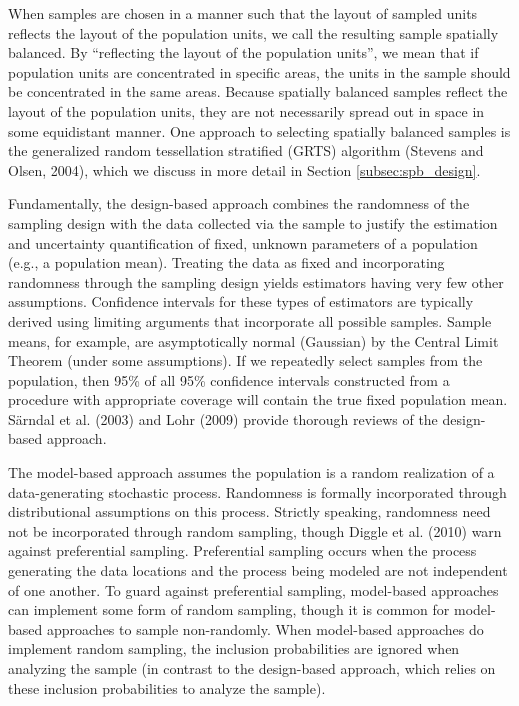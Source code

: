 \documentclass[]{elsarticle} %
\begin{document}
When samples are chosen in a manner such that the layout of sampled
units reflects the layout of the population units, we call the resulting
sample spatially balanced. By ``reflecting the layout of the population
units'', we mean that if population units are concentrated in specific
areas, the units in the sample should be concentrated in the same areas.
Because spatially balanced samples reflect the layout of the population
units, they are not necessarily spread out in space in some equidistant
manner. One approach to selecting spatially balanced samples is the
generalized random tessellation stratified (GRTS) algorithm (Stevens and
Olsen, 2004), which we discuss in more detail in Section
\ref{subsec:spb_design}.

Fundamentally, the design-based approach combines the randomness of the
sampling design with the data collected via the sample to justify the
estimation and uncertainty quantification of fixed, unknown parameters
of a population (e.g., a population mean). Treating the data as fixed
and incorporating randomness through the sampling design yields
estimators having very few other assumptions. Confidence intervals for
these types of estimators are typically derived using limiting arguments
that incorporate all possible samples. Sample means, for example, are
asymptotically normal (Gaussian) by the Central Limit Theorem (under
some assumptions). If we repeatedly select samples from the population,
then 95\% of all 95\% confidence intervals constructed from a procedure
with appropriate coverage will contain the true fixed population mean.
Särndal et al. (2003) and Lohr (2009) provide thorough reviews of the
design-based approach.

The model-based approach assumes the population is a random realization
of a data-generating stochastic process. Randomness is formally
incorporated through distributional assumptions on this process.
Strictly speaking, randomness need not be incorporated through random
sampling, though Diggle et al. (2010) warn against preferential
sampling. Preferential sampling occurs when the process generating the
data locations and the process being modeled are not independent of one
another. To guard against preferential sampling, model-based approaches
can implement some form of random sampling, though it is common for
model-based approaches to sample non-randomly. When model-based
approaches do implement random sampling, the inclusion probabilities are
ignored when analyzing the sample (in contrast to the design-based
approach, which relies on these inclusion probabilities to analyze the
sample).
\end{document}
